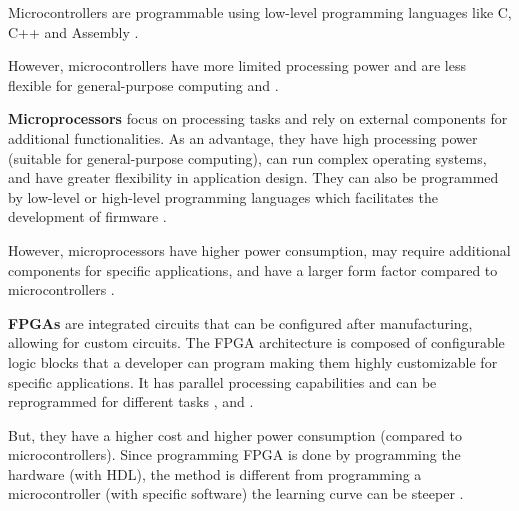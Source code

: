 Microcontrollers are programmable using low-level programming languages like C, C++ and Assembly \cite{OBC1}.

However, microcontrollers have more limited processing power and are less flexible for general-purpose computing \cite{OBC1} and \cite{OBC2}.

\textbf{Microprocessors} focus on processing tasks and rely on external components for additional functionalities.
As an advantage, they have high processing power (suitable for general-purpose computing), can run complex operating systems, and have greater flexibility in application design.
They can also be programmed by low-level or high-level programming languages which facilitates the development of firmware \cite{OBC5}.

However, microprocessors have higher power consumption, may require additional components for specific applications, and have a larger form factor compared to microcontrollers \cite{OBC5}.

\textbf{\glspl{FPGA}} are integrated circuits that can be configured after manufacturing, allowing for custom circuits.
The \gls{FPGA} architecture is composed of configurable logic blocks that a developer can program making them highly customizable for specific applications.
It has parallel processing capabilities and can be reprogrammed for different tasks \cite{OBC1}, \cite{OBC3} and \cite{OBC5}.

But, they have a higher cost and higher power consumption (compared to microcontrollers).
Since programming \gls{FPGA} is done by programming the hardware (with \gls{HDL}), the method is different from programming a microcontroller (with specific software) the learning curve can be steeper \cite{OBC1} \cite{OBC3}.

